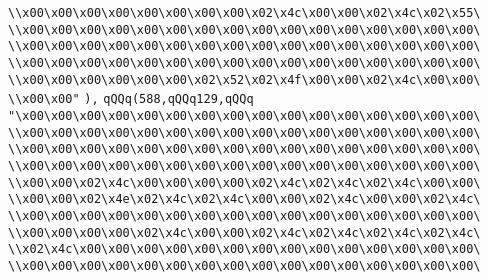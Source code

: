 \verb|\\x00\x00\x00\x00\x00\x00\x00\x00\x02\x4c\x00\x00\x02\x4c\x02\x55\|\newline
\verb|\\x00\x00\x00\x00\x00\x00\x00\x00\x00\x00\x00\x00\x00\x00\x00\x00\|\newline
\verb|\\x00\x00\x00\x00\x00\x00\x00\x00\x00\x00\x00\x00\x00\x00\x00\x00\|\newline
\verb|\\x00\x00\x00\x00\x00\x00\x00\x00\x00\x00\x00\x00\x00\x00\x00\x00\|\newline
\verb|\\x00\x00\x00\x00\x00\x00\x02\x52\x02\x4f\x00\x00\x02\x4c\x00\x00\|\newline
\verb|\\x00\x00"|\newline
\verb|),|\newline
\verb|qQQq(588,qQQq129,qQQq|\newline
\verb|"\x00\x00\x00\x00\x00\x00\x00\x00\x00\x00\x00\x00\x00\x00\x00\x00\|\newline
\verb|\\x00\x00\x00\x00\x00\x00\x00\x00\x00\x00\x00\x00\x00\x00\x00\x00\|\newline
\verb|\\x00\x00\x00\x00\x00\x00\x00\x00\x00\x00\x00\x00\x00\x00\x00\x00\|\newline
\verb|\\x00\x00\x00\x00\x00\x00\x00\x00\x00\x00\x00\x00\x00\x00\x00\x00\|\newline
\verb|\\x00\x00\x02\x4c\x00\x00\x00\x00\x02\x4c\x02\x4c\x02\x4c\x00\x00\|\newline
\verb|\\x00\x00\x02\x4e\x02\x4c\x02\x4c\x00\x00\x02\x4c\x00\x00\x02\x4c\|\newline
\verb|\\x00\x00\x00\x00\x00\x00\x00\x00\x00\x00\x00\x00\x00\x00\x00\x00\|\newline
\verb|\\x00\x00\x00\x00\x02\x4c\x00\x00\x02\x4c\x02\x4c\x02\x4c\x02\x4c\|\newline
\verb|\\x02\x4c\x00\x00\x00\x00\x00\x00\x00\x00\x00\x00\x00\x00\x00\x00\|\newline
\verb|\\x00\x00\x00\x00\x00\x00\x00\x00\x00\x00\x00\x00\x00\x00\x00\x00\|\newline
